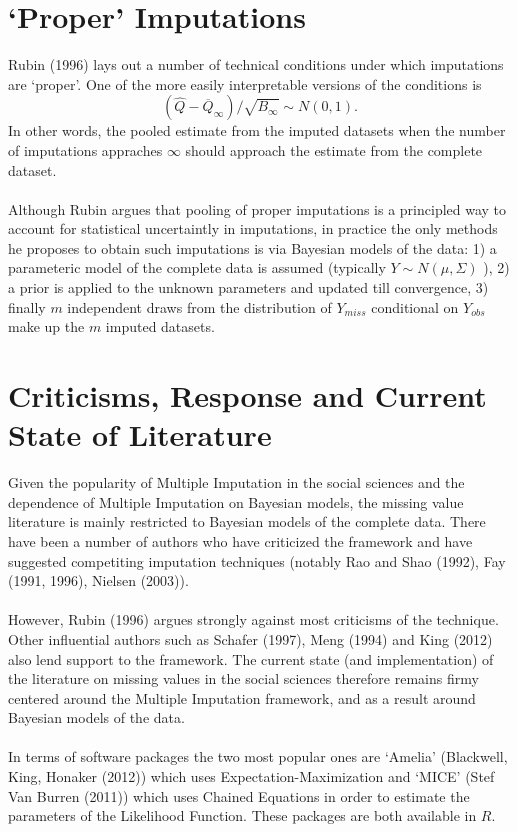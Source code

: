 \documentclass[11pt]{article} %
\begin{document}
\section{`Proper' Imputations}
Rubin (1996) lays out a number of technical conditions under which imputations are `proper'. One of the more easily interpretable versions of the conditions is
$$
(\widehat{Q} - \overline{Q}_{\infty})/ \sqrt{B_{\infty}} \sim N(0,1).
$$ 
In other words, the pooled estimate from the imputed datasets when the number of imputations appraches $\infty$ should approach the estimate from the complete dataset. \\\\ 
Although Rubin argues that pooling of proper imputations is a principled way to account for statistical uncertaintly in imputations, in practice the only methods he proposes  to obtain such imputations is via Bayesian models of the data: 1) a parameteric model of the complete data is assumed (typically $Y \sim N(\mu, \Sigma)$ ), 2) a prior is applied to the unknown parameters and updated till convergence, 3) finally $m$ independent draws from the distribution of $Y_{miss}$ conditional on $Y_{obs}$ make up the $m$ imputed datasets. 
 

\section{Criticisms, Response and Current State of Literature}
Given the popularity of Multiple Imputation in the social sciences and the dependence of Multiple Imputation on Bayesian models, the missing value literature is mainly restricted to Bayesian models of the complete data. There have been a number of authors who have criticized the framework and have suggested competiting imputation techniques (notably Rao and Shao (1992), Fay (1991, 1996), Nielsen (2003)).
\\\\
However, Rubin (1996) argues strongly against most criticisms of the technique. Other influential authors such as Schafer (1997), Meng (1994) and King (2012) also lend support to the framework. The current state (and implementation)  of the literature on missing values in the social sciences therefore remains firmy centered around the Multiple Imputation framework, and as a result around Bayesian models of the data.
\\\\
In terms of software packages the two most popular ones are `Amelia' (Blackwell, King, Honaker (2012)) which uses Expectation-Maximization and `MICE' (Stef Van Burren (2011)) which uses Chained Equations in order to estimate the parameters of the Likelihood Function. These packages are both available in $R$.
\end{document}
